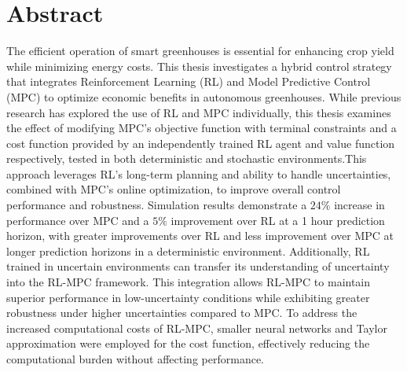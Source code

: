 \chapter*{Abstract}


      The efficient operation of smart greenhouses is essential for enhancing crop yield while minimizing energy costs. This thesis investigates a hybrid control strategy that integrates Reinforcement Learning (RL) and Model Predictive Control (MPC) to optimize economic benefits in autonomous greenhouses. While previous research has explored the use of RL and MPC individually, this thesis examines the effect of modifying MPC’s objective function with terminal constraints and a cost function provided by an independently trained RL agent and value function respectively, tested in both deterministic and stochastic environments.This approach leverages RL's long-term planning and ability to handle uncertainties, combined with MPC’s online optimization, to improve overall control performance and robustness. Simulation results demonstrate a $24\%$ increase in performance over MPC and a $5\%$ improvement over RL at a 1 hour prediction horizon, with greater improvements over RL and less improvement over MPC at longer prediction horizons in a deterministic environment.  Additionally, RL trained in uncertain environments can transfer its understanding of uncertainty into the RL-MPC framework. This integration allows RL-MPC to maintain superior performance in low-uncertainty conditions while exhibiting greater robustness under higher uncertainties compared to MPC. To address the increased computational costs of RL-MPC, smaller neural networks and Taylor approximation were employed for the cost function, effectively reducing the computational burden without affecting performance.
      
      
      